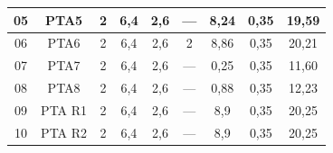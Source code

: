 \documentclass[	DIV=calc,%
							paper=a4,%
							fontsize=12pt,%
							onecolumn]{scrartcl}	 					%
\begin{document}
{\begin{tabular}{|c|c|c|c|c|c|c|c|c|}
	05                 & PTA5               & 2                                                    & 6,4                                         & 2,6                                           & ---                                           & 8,24                                             & 0,35                                            & 19,59                                                             \\ \hline
	06                 & PTA6               & 2                                                    & 6,4                                         & 2,6                                           & 2                                             & 8,86                                             & 0,35                                            & 20,21                                                             \\ \hline
	07                 & PTA7               & 2                                                    & 6,4                                         & 2,6                                           & ---                                           & 0,25                                             & 0,35                                            & 11,60                                                             \\ \hline
	08                 & PTA8               & 2                                                    & 6,4                                         & 2,6                                           & ---                                           & 0,88                                             & 0,35                                            & 12,23                                                             \\ \hline
	09                 & PTA R1             & 2                                                    & 6,4                                         & 2,6                                           & ---                                           & 8,9                                              & 0,35                                            & 20,25                                                             \\ \hline
	10                 & PTA R2             & 2                                                    & 6,4                                         & 2,6                                           & ---                                           & 8,9                                              & 0,35                                            & 20,25                                                             \\ \hline

\end{tabular}}
\end{document}
